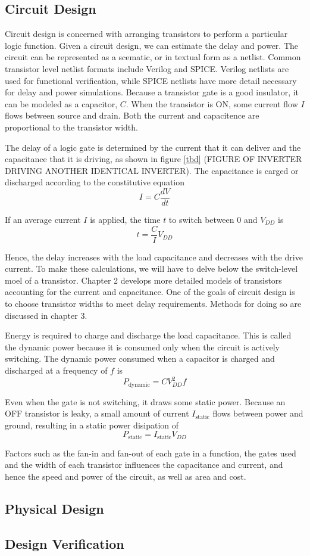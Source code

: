 \subsection{Circuit Design}
Circuit design is concerned with arranging transistors to perform a particular logic function. Given a circuit design, we can estimate the delay and power. The circuit
can be represented as a scematic, or in textual form as a netlist. Common transistor level netlist formats include Verilog and SPICE. Verilog netlists are used for functional
verification, while SPICE netlists have more detail necessary for delay and power simulations. Because a transistor gate is a good insulator, it can be modeled as a capacitor,
$C$. When the transistor is ON, some current flow $I$ flows between source and drain. Both the current and capacitence are proportional to the transistor width.

The delay of a logic gate is determined by the current that it can deliver and the capacitance that it is driving, as shown in figure \ref{tbd} (FIGURE OF INVERTER DRIVING 
ANOTHER IDENTICAL INVERTER). The capacitance is carged or discharged according to the constitutive equation
\[
    I = C \frac{dV}{dt}
\]

If an average current $I$ is applied, the time $t$ to switch between 0 and $V_{DD}$ is 
\[
    t = \frac{C}{I}V_{DD}
\]

Hence, the delay increases with the load capacitance and decreases with the drive current. To make these calculations, we will have to delve below the switch-level moel of a 
transistor. Chapter 2 develops more detailed models of transistors accounting for the current and capacitance. One of the goals of circuit design is to choose transistor 
widths to meet delay requirements. Methods for doing so are discussed in chapter 3.

Energy is required to charge and discharge the load capacitance. This is called the dynamic power because it is consumed only when the circuit is actively switching. The 
dynamic power consumed when a capacitor is charged and discharged at a frequency of $f$ is 
\[
    P_{\text{dynamic}} = CV^2_{DD}f
\]

Even when the gate is not switching, it draws some static power. Because an OFF transistor is leaky, a small amount of current $I_{\text{static}}$ flows between power and
ground, resulting in a static power disipation of
\[
    P_{\text{static}} = I_{\text{static}}V_{DD}
\]

Factors such as the fan-in and fan-out of each gate in a function, the gates used and the width of each transistor influences the capacitance and current, and 
hence the speed and power of the circuit, as well as area and cost.

\subsection{Physical Design}

\subsection{Design Verification}
